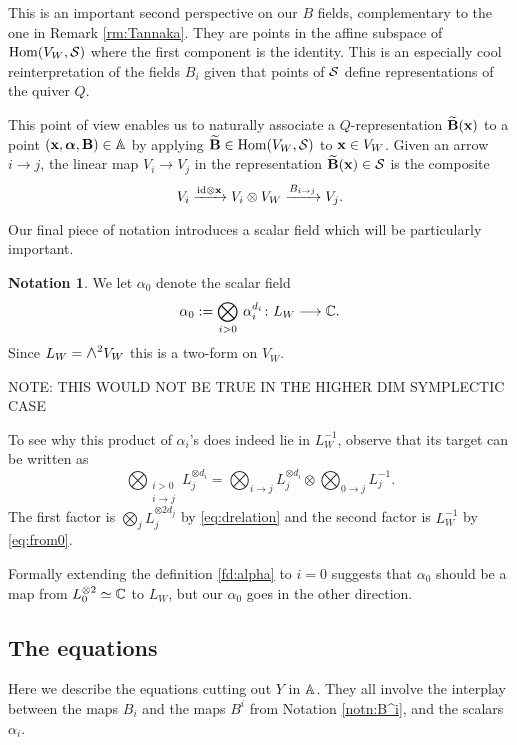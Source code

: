 \documentclass{amsart}
\newcommand{\balpha}{\boldsymbol{\alpha}}
\theoremstyle{definition}
\newtheorem{notn}[theorem]{Notation}
\newcommand{\Wedge}{\mbox{\scalebox{1.2}{$\wedge$}}}
\newcommand\VW{V_W}
\newcommand\Y{Y}
\begin{document}
This is an important second perspective on our $B$ fields, complementary to the one in Remark \ref{rm:Tannaka}.
They are points in the affine subspace of $\Hom(\VW, \cS)$ where the first component is the identity.
This is an especially cool reinterpretation of the fields $B_i$ given that points of $\mathcal{S}$ define representations of the quiver $Q$.

This point of view enables us to naturally associate a $Q$-representation $\widetilde{\mathbf{B}}(\mathbf{x})$ to a point $(\bfx, \balpha, \bfB) \in \bA$ by applying $\widetilde{\bfB} \in \Hom(\VW, \cS)$ to $\bfx \in \VW$.
Given an arrow $i\to j$, the linear map $V_i \rightarrow V_j$ in the representation $\widetilde{\mathbf{B}}(\mathbf{x}) \in \mathcal{S}$ is the composite
\begin{equation}\label{eq:Btilde}
 V_i \xrightarrow{\textup{id} \otimes \bfx} V_i \otimes \VW \xrightarrow{B_{i\to j}} V_j.
\end{equation}

Our final piece of notation introduces a scalar field which will be particularly important.

\begin{notn}
We let $\alpha_0$ denote the scalar field 
$$\alpha_0:= \bigotimes_{i>0} \,\alpha_i^{d_i} \colon L_W \longrightarrow \mathbb{C}.$$
Since $L_W=\Wedge^2 \VW$ this is a two-form on $\VW$.

NOTE: THIS WOULD NOT BE TRUE IN THE HIGHER DIM SYMPLECTIC CASE
\end{notn}
To see why this product of $\alpha_i$'s does indeed lie in $L_W^{-1}$, observe that its target can be written as
$$ \bigotimes_{\substack{i>0 \\ i\to j}} L_j^{\otimes d_i} = \bigotimes_{i\to j} L_j^{\otimes d_i}  \otimes\bigotimes _{0\to j} L_j^{-1}.$$
The first factor is $\bigotimes_{j} L_j^{\otimes 2d_j}$ by \eqref{eq:drelation} and the second factor is $L_W^{-1}$ by \eqref{eq:from0}.  


\begin{remark} Formally extending the definition \eqref{fd:alpha} to $i=0$ suggests that $\alpha_0$ should be a map from $L_0^{\otimes 2}\simeq \mathbb{C}$ to $L_W$, but our $\alpha_0$ goes in the other direction. 
\end{remark}




\subsection{The equations}
Here we describe the equations cutting out $\Y$ in $\mathbb{A}$. They all involve the interplay between the maps $B_i$ and the maps $B^i$ from Notation \ref{notn:B^i}, and the scalars $\alpha_i$. 
\end{document}
